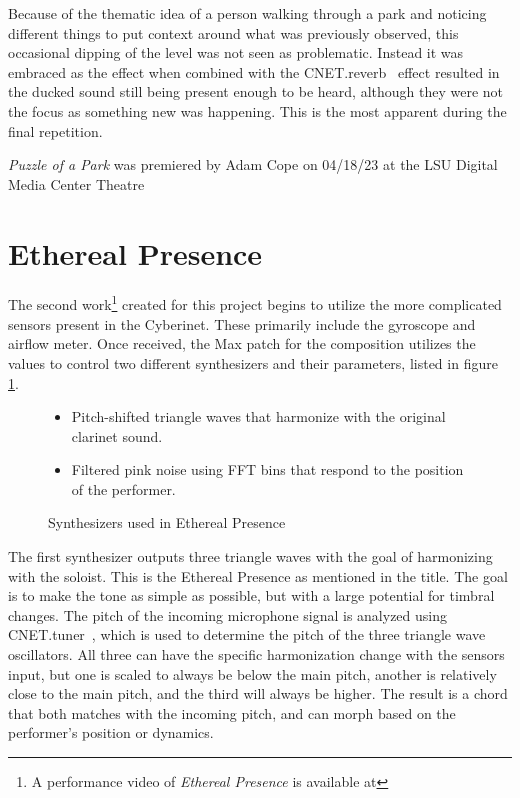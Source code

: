 Because of the thematic idea of a person walking through a park and noticing different things to put context around what was previously observed, this occasional dipping of the level was not seen as problematic. Instead it was embraced as the effect when combined with the CNET.reverb~ effect resulted in the ducked sound still being present enough to be heard, although they were not the focus as something new was happening. This is the most apparent during the final repetition.

\textit{Puzzle of a Park} was premiered by Adam Cope on 04/18/23 at the LSU Digital Media Center Theatre

\section{Ethereal Presence}
The second work\footnote{A performance video of \textit{Ethereal Presence} is available at} created for this project begins to utilize the more complicated sensors present in the Cyberinet. These primarily include the gyroscope and airflow meter. Once received, the Max patch for the composition utilizes the values to control two different synthesizers and their parameters, listed in figure \ref{fig:etherealSynths}. 

\begin{figure}
    \centering
\begin{itemize}
    \item Pitch-shifted triangle waves that harmonize with the original clarinet sound.
    \item Filtered pink noise using FFT bins that respond to the position of the performer.
\end{itemize}
    \caption{Synthesizers used in Ethereal Presence}
    \label{fig:etherealSynths}
\end{figure}



The first synthesizer outputs three triangle waves with the goal of harmonizing with the soloist. This is the Ethereal Presence as mentioned in the title. The goal is to make the tone as simple as possible, but with a large potential for timbral changes. The pitch of the incoming microphone signal is analyzed using CNET.tuner~, which is used to determine the pitch of the three triangle wave oscillators. All three can have the specific harmonization change with the sensors input, but one is scaled to always be below the main pitch, another is relatively close to the main pitch, and the third will always be higher. The result is a chord that both matches with the incoming pitch, and can morph based on the performer's position or dynamics. 


